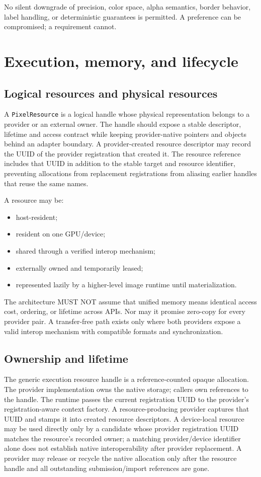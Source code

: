 \documentclass[11pt,a4paper,oneside]{article}
\newcommand{\PixelResource}{\texttt{PixelResource}}
\begin{document}
No silent downgrade of precision, color space, alpha semantics, border behavior, label handling, or deterministic guarantees is permitted. A preference can be compromised; a requirement cannot.

\section{Execution, memory, and lifecycle}

\subsection{Logical resources and physical resources}

A \PixelResource{} is a logical handle whose physical representation belongs to a provider or an external owner. The handle should expose a stable descriptor, lifetime and access contract while keeping provider-native pointers and objects behind an adapter boundary. A provider-created resource descriptor may record the UUID of the provider registration that created it. The resource reference includes that UUID in addition to the stable target and resource identifier, preventing allocations from replacement registrations from aliasing earlier handles that reuse the same names.

A resource may be:
\begin{itemize}
  \item host-resident;
  \item resident on one GPU/device;
  \item shared through a verified interop mechanism;
  \item externally owned and temporarily leased;
  \item represented lazily by a higher-level image runtime until materialization.
\end{itemize}

The architecture MUST NOT assume that unified memory means identical access cost, ordering, or lifetime across APIs. Nor may it promise zero-copy for every provider pair. A transfer-free path exists only where both providers expose a valid interop mechanism with compatible formats and synchronization.

\subsection{Ownership and lifetime}

The generic execution resource handle is a reference-counted opaque allocation. The provider implementation owns the native storage; callers own references to the handle. The runtime passes the current registration UUID to the provider's registration-aware context factory. A resource-producing provider captures that UUID and stamps it into created resource descriptors. A device-local resource may be used directly only by a candidate whose provider registration UUID matches the resource's recorded owner; a matching provider/device identifier alone does not establish native interoperability after provider replacement. A provider may release or recycle the native allocation only after the resource handle and all outstanding submission/import references are gone.
\end{document}
